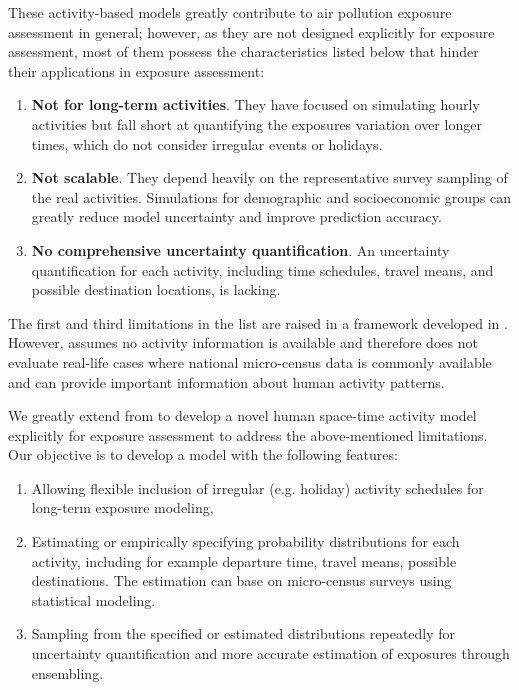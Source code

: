 \documentclass[]{article}
\begin{document}
These activity-based models greatly contribute to air pollution exposure assessment in general; however, as they are not designed explicitly for exposure assessment, most of them possess the characteristics listed below that hinder their applications in exposure assessment: 

\begin{enumerate}
    
    \item \textbf{Not for long-term activities}. They have focused on simulating hourly activities but fall short at quantifying the exposures variation over longer times, which do not consider irregular events or holidays. 
    
    \item \textbf{Not scalable}. They depend heavily on the representative survey sampling of the real activities. Simulations for demographic and socioeconomic groups \citep{lee2013impact} can greatly reduce model uncertainty and improve prediction accuracy.   
    
    \item \textbf{No comprehensive uncertainty quantification}. An uncertainty quantification for each activity, including time schedules, travel means, and possible destination locations, is lacking.  
\end{enumerate}
 
 The first and third limitations in the list are raised in a framework developed in \cite{lu2019activity}. However, \cite{lu2019activity} assumes no activity information is available and therefore does not evaluate real-life cases where national micro-census data is commonly available and can provide important information about human activity patterns.  
 
We greatly extend from \cite{lu2019activity} to develop a novel human space-time activity model explicitly for exposure assessment to address the above-mentioned limitations. Our objective is to develop a model with the following features: 

\begin{enumerate}

    \item Allowing flexible inclusion of irregular (e.g. holiday) activity schedules for long-term exposure modeling, 
    
    \item Estimating or empirically specifying probability distributions for each activity, including for example departure time, travel means, possible destinations. The estimation can base on micro-census surveys using statistical modeling.
    
    \item Sampling from the specified or estimated distributions repeatedly for uncertainty quantification and more accurate estimation of exposures through ensembling. 
\end{enumerate}
\end{document}
